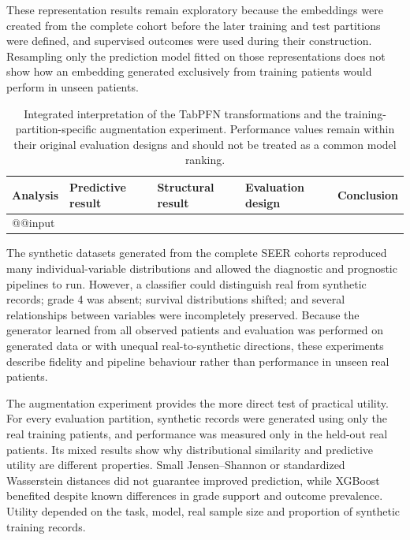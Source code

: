 These representation results remain exploratory because the embeddings were
created from the complete cohort before the later training and test partitions
were defined, and supervised outcomes were used during their construction.
Resampling only the prediction model fitted on those representations does not
show how an embedding generated exclusively from training patients would
perform in unseen patients.

\begin{table}[htbp]
\centering\scriptsize
\setlength{\tabcolsep}{3pt}
\caption{Integrated interpretation of the TabPFN transformations and the
training-partition-specific augmentation experiment.  Performance values remain
within their original evaluation designs and should not be treated as a common
model ranking.}
\label{tab:discussion:transformations}
\begin{tabularx}{\linewidth}{@{}>{\RaggedRight\arraybackslash}p{2.35cm}>{\RaggedRight\arraybackslash}p{3.15cm}>{\RaggedRight\arraybackslash}p{3.0cm}>{\RaggedRight\arraybackslash}p{3.0cm}Y@{}}
\toprule
Analysis & Predictive result & Structural result & Evaluation design & Conclusion \\
\midrule
\csname @@input
\bottomrule
\end{tabularx}
\end{table}

The synthetic datasets generated from the complete SEER cohorts reproduced many
individual-variable distributions and allowed the diagnostic and prognostic
pipelines to run.  However, a classifier could distinguish real from synthetic
records; grade 4 was absent; survival distributions shifted; and several
relationships between variables were incompletely preserved.  Because the
generator learned from all observed patients and evaluation was performed on
generated data or with unequal real-to-synthetic directions, these experiments
describe fidelity and pipeline behaviour rather than performance in unseen real
patients.

The augmentation experiment provides the more direct test of practical utility.
For every evaluation partition, synthetic records were generated using only the
real training patients, and performance was measured only in the held-out real
patients.  Its mixed results show why distributional similarity and predictive
utility are different properties.  Small Jensen--Shannon or standardized
Wasserstein distances did not guarantee improved prediction, while XGBoost
benefited despite known differences in grade support and outcome prevalence.
Utility depended on the task, model, real sample size and proportion of
synthetic training records.

